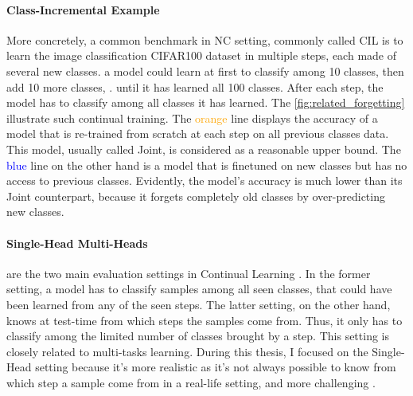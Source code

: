 \paragraph{Class-Incremental Example} More concretely, a common benchmark in \ac{NC} setting,
commonly called \ac{CIL} is to learn the image classification CIFAR100 dataset
\citep{krizhevskycifar100} in multiple steps, each made of several new classes. \eg a model could
learn at first to classify among 10 classes, then add 10 more classes, \etc. until it has learned
all 100 classes. After each step, the model has to classify among all classes it has learned. The
\autoref{fig:related_forgetting} illustrate such continual training. The \textcolor{orange}{orange}
line displays the accuracy of a model that is re-trained from scratch at each step on all previous
classes data. This model, usually called Joint, is considered as a reasonable upper bound. The
\textcolor{blue}{blue} line on the other hand is a model that is finetuned on new classes but has no
access to previous classes. Evidently, the model's accuracy is much lower than its Joint
counterpart, because it forgets completely old classes by over-predicting new classes.

\paragraph{Single-Head \vs Multi-Heads} are the two main evaluation settings in Continual Learning
\citep{chaudhry2018riemannien_walk}. In the former setting, a model has to classify samples among
all seen classes, that could have been learned from any of the seen steps. The latter setting, on
the other hand, knows at test-time from which steps the samples come from. Thus, it only has to
classify among the limited number of classes brought by a step. This setting is closely related to
multi-tasks learning. During this thesis, I focused on the Single-Head setting because it's more
realistic as it's not always possible to know from which step a sample come from in a real-life
setting, and more challenging \citep{lesort2019regulshortcomings}.

